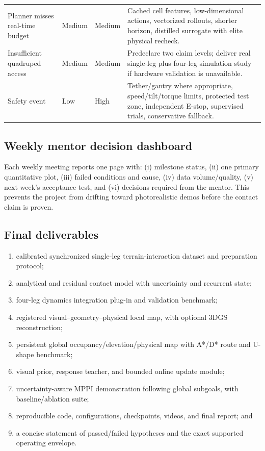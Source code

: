 \begin{longtable}{@{}L{31mm}C{14mm}C{14mm}L{74mm}@{}}
Planner misses real-time budget & Medium & Medium & Cached cell features, low-dimensional actions, vectorized rollouts, shorter horizon, distilled surrogate with elite physical recheck.\\
Insufficient quadruped access & Medium & Medium & Predeclare two claim levels; deliver real single-leg plus four-leg simulation study if hardware validation is unavailable.\\
Safety event & Low & High & Tether/gantry where appropriate, speed/tilt/torque limits, protected test zone, independent E-stop, supervised trials, conservative fallback.\\
\bottomrule
\end{longtable}

\subsection{Weekly mentor decision dashboard}

Each weekly meeting reports one page with: (i) milestone status, (ii) one primary quantitative plot, (iii) failed conditions and cause, (iv) data volume/quality, (v) next week's acceptance test, and (vi) decisions required from the mentor. This prevents the project from drifting toward photorealistic demos before the contact claim is proven.

\subsection{Final deliverables}

\begin{enumerate}
  \item calibrated synchronized single-leg terrain-interaction dataset and preparation protocol;
  \item analytical and residual contact model with uncertainty and recurrent state;
  \item four-leg dynamics integration plug-in and validation benchmark;
  \item registered visual--geometry--physical local map, with optional 3DGS reconstruction;
  \item persistent global occupancy/elevation/physical map with A*/D* route and U-shape benchmark;
  \item visual prior, response teacher, and bounded online update module;
  \item uncertainty-aware MPPI demonstration following global subgoals, with baseline/ablation suite;
  \item reproducible code, configurations, checkpoints, videos, and final report; and
  \item a concise statement of passed/failed hypotheses and the exact supported operating envelope.
\end{enumerate}

